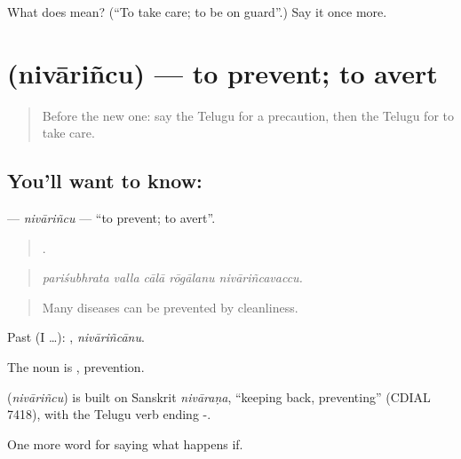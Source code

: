 \begin{tcolorbox}[breakable,colback=teal!4,colframe=teal!35!black,title={Before you move on}]
What does  mean? (\textquotedblleft{}To take care; to be on guard\textquotedblright{}.) Say it once more.
\end{tcolorbox}
\section[\texorpdfstring{\te{నివారించు} (nivāriñcu)}{నివారించు (nivāriñcu)}]{ (nivāriñcu) — to prevent; to avert}

\label{lesson:TE-C421-nivarincu}



\begin{quote}
Before the new one: say the Telugu for a precaution, then the Telugu for to take care.
\end{quote}

\subsection*{You'll want to know: }
\textbf{} — \emph{nivāriñcu} — \textquotedblleft{}to prevent; to avert\textquotedblright{}.

\begin{quote}
    .
\end{quote}

\begin{quote}
\emph{pariśubhrata valla cālā rōgālanu nivāriñcavaccu.}
\end{quote}

\begin{quote}
Many diseases can be prevented by cleanliness.
\end{quote}

Past (I …): , \emph{nivāriñcānu}.

The noun is , prevention.

\begin{cousinweb}
\textbf{} (\emph{nivāriñcu}) is built on Sanskrit \emph{nivāraṇa}, \textquotedblleft{}keeping back, preventing\textquotedblright{} (CDIAL 7418), with the Telugu verb ending -.
\end{cousinweb}

\begin{grammarlens}[title={What you've built}]
One more word for saying what happens if.
\end{grammarlens}

